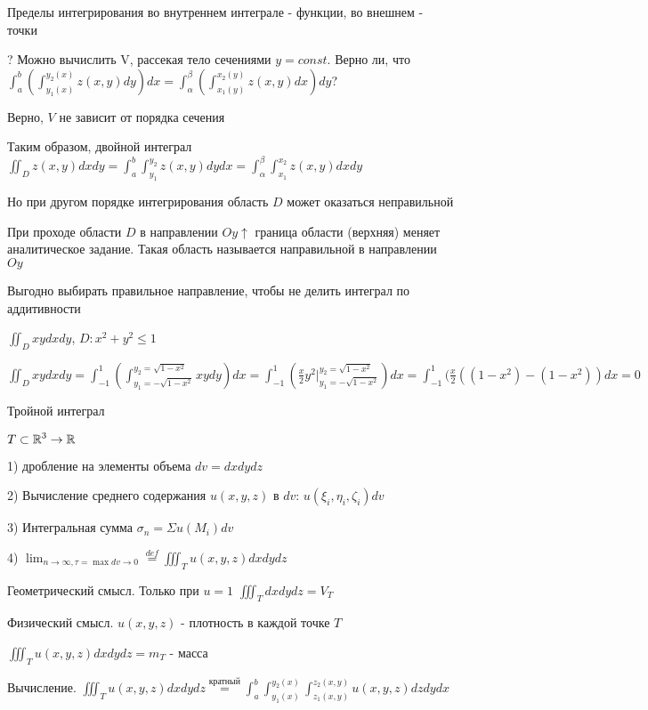 \documentclass[12pt]{article}
\begin{document}
    Пределы интегрирования во внутреннем интеграле - функции, во внешнем - точки

    ? Можно вычислить V, рассекая тело сечениями $y = const$. Верно ли, что $\displaystyle \int_a^b \left(\int_{y_1(x)}^{y_2(x)} z(x, y) dy\right) dx = \int_\alpha^\beta \left(\int_{x_1(y)}^{x_2(y)} z(x, y) dx\right) dy$?

    Верно, $V$ не зависит от порядка сечения

    Таким образом, двойной интеграл $\displaystyle \iint_D z(x, y) dxdy = \int_a^b \int_{y_1}^{y_2} z(x, y) dydx = \int_\alpha^\beta \int_{x_1}^{x_2} z(x, y) dxdy$

    Но при другом порядке интегрирования область $D$ может оказаться неправильной

    \Def При проходе области $D$ в направлении $Oy \uparrow$ граница области (верхняя) меняет аналитическое задание. Такая область называется направильной в направлении $Oy$

    Выгодно выбирать правильное направление, чтобы не делить интеграл по аддитивности

    \Ex $\displaystyle \iint_D xy dx dy$, $\displaystyle D : x^2 + y^2 \leq 1$

    $\displaystyle \iint_D xy dx dy = \int_{-1}^1 (\int_{y_1 = -\sqrt{1-x^2}}^{y_2 = \sqrt{1-x^2}} xy dy) dx = \int_{-1}^1 (\frac{x}{2} y^2 \Big|_{y_1 = -\sqrt{1-x^2}}^{y_2 = \sqrt{1-x^2}}) dx =
    \int_{-1}^1 (\frac{x}{2} ((1 - x^2) - (1 - x^2)) dx = 0$

    \Def Тройной интеграл

    $\displaystyle T \subset \mathbb{R}^3 \rightarrow \mathbb{R}$

    1) дробление на элементы объема $dv = dxdydz$

    2) Вычисление среднего содержания $u(x, y, z)$ в $dv$: $\displaystyle u(\xi_i, \eta_i, \zeta_i) dv$

    3) Интегральная сумма $\displaystyle \sigma_n = \Sigma u(M_i) dv$

    4) $\displaystyle \lim_{n \to \infty, \tau = \max dv \to 0} \stackrel{def}{=} \iiint_T u(x, y, z) dxdydz$

    Геометрический смысл. Только при $u = 1$ $\displaystyle \iiint_T dxdydz = V_T$

    Физический смысл. $u(x, y, z)$ - плотность в каждой точке $T$

    $\displaystyle \iiint_T u(x, y, z) dxdydz = m_T$ - масса

    Вычисление. $\displaystyle \iiint_T u(x, y, z) dxdydz \stackrel{\text{кратный}}{=} \int^b_a \int_{y_1(x)}^{y_2(x)} \int_{z_1(x, y)}^{z_2(x, y)} u(x, y, z) dz dy dx$
\end{document}
